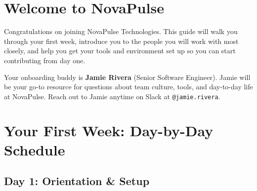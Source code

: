 \documentclass[
    language=english,
    doctype=onboarding-guide,
    institution=none,
]{../../omnilatex}
\begin{document}
\maketitle

\section*{Welcome to NovaPulse}

Congratulations on joining NovaPulse Technologies. This guide will walk you
through your first week, introduce you to the people you will work with most
closely, and help you get your tools and environment set up so you can start
contributing from day one.

Your onboarding buddy is \textbf{Jamie Rivera} (Senior Software Engineer).
Jamie will be your go-to resource for questions about team culture, tools,
and day-to-day life at NovaPulse. Reach out to Jamie anytime on Slack at
\texttt{@jamie.rivera}.

\section{Your First Week: Day-by-Day Schedule}

\subsection{Day 1: Orientation \& Setup}
\end{document}

